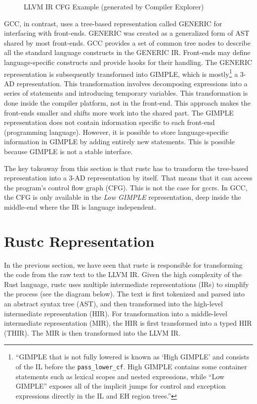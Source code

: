 \documentclass[
  11pt,
  twoside,symmetric]{report}
\begin{document}
\begin{figure}
\centering

\caption{LLVM IR CFG Example (generated by Compiler Explorer)}
\end{figure}

GCC, in contrast, uses a tree-based representation called
GENERIC for interfacing with
front-ends. GENERIC was created as a generalized form of AST shared by
most front-ends. GCC provides a set of common tree nodes to describe all
the standard language constructs in the GENERIC IR. Front-ends may
define language-specific constructs and provide hooks for their
handling. The GENERIC
representation is subsequently transformed into GIMPLE, which is
mostly\footnote{``GIMPLE that is not fully lowered is known as `High
  GIMPLE' and consists of the IL before the \texttt{pass\_lower\_cf}.
  High GIMPLE contains some container statements such as lexical scopes
  and nested expressions, while ``Low GIMPLE'' exposes all of the
  implicit jumps for control and exception expressions directly in the
  IL and EH region trees.''} a
3-AD representation. This transformation involves decomposing
expressions into a series of statements and introducing temporary
variables. This transformation is done inside the compiler platform, not
in the front-end. This approach makes the front-ends smaller and shifts
more work into the shared part. The GIMPLE representation does not
contain information specific to each front-end (programming language).
However, it is possible to store language-specific information in GIMPLE
by adding entirely new statements. This is possible because GIMPLE is not a stable interface.

The key takeaway from this section is that rustc has to transform the
tree-based representation into a 3-AD representation by itself. That
means that it can access the program's control flow graph (CFG). This is
not the case for gccrs. In GCC, the CFG is only available in the
\emph{Low GIMPLE} representation, deep inside the middle-end where the
IR is language independent.

\section{Rustc Representation}\label{sec:rustc-representation}

In the previous section, we have seen that rustc is responsible for
transforming the code from the raw text to the LLVM IR. Given the high
complexity of the Rust language, rustc uses multiple intermediate
representations (IRs) to simplify the process (see the diagram below).
The text is first tokenized and parsed into an abstract syntax tree
(AST), and then transformed into the high-level intermediate
representation (HIR). For transformation into a middle-level
intermediate representation (MIR), the HIR is first transformed into a
typed HIR (THIR). The MIR is then transformed into the LLVM IR.
\end{document}
